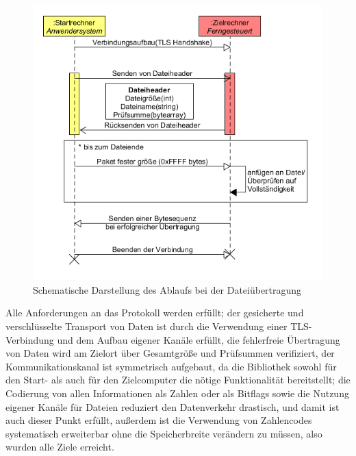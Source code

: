 \begin{figure}
\includegraphics[scale=.5]{diagramFileProtocol}
\caption{Schematische Darstellung des Ablaufs bei der Dateiübertragung}
\label{file_diagram}
\end{figure}

Alle Anforderungen an das Protokoll werden erfüllt; der gesicherte und verschlüsselte Transport von Daten ist durch die Verwendung einer TLS-Verbindung und dem Aufbau eigener Kanäle erfüllt, die fehlerfreie Übertragung von Daten wird am Zielort über Gesamtgröße und Prüfsummen verifiziert, der Kommunikationskanal ist symmetrisch aufgebaut, da die Bibliothek sowohl für den Start- als auch für den Zielcomputer die nötige Funktionalität bereitstellt; die Codierung von allen Informationen als Zahlen oder als Bitflags sowie die Nutzung eigener Kanäle für Dateien reduziert den Datenverkehr drastisch, und damit ist auch dieser Punkt erfüllt, außerdem ist die Verwendung von Zahlencodes systematisch erweiterbar ohne die Speicherbreite verändern zu müssen, also wurden alle Ziele erreicht.

